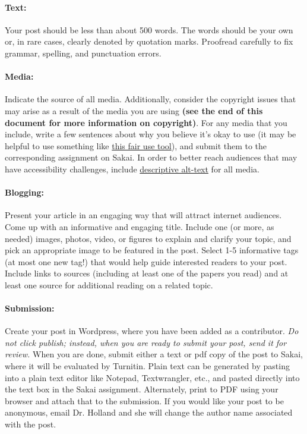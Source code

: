 \documentclass[11pt]{article}
\begin{document}
\paragraph{Text:} 
Your post should be less than about 500 words.  
The words should be your own or, in rare cases, clearly denoted by quotation marks.  
Proofread carefully to fix grammar, spelling, and punctuation errors. 

\paragraph{Media:}
Indicate the source of all media.  
Additionally, consider the copyright issues that may arise as a result of the media you are using
{\bf (see the end of this document for more information on copyright)}.  For any media that you include, write a few sentences about why you believe it's okay to use (it may be helpful to use something like \href{https://www.lib.umn.edu/copyright/fairthoughts}{this fair use tool}), and submit them to the corresponding assignment on Sakai.
In order to better reach audiences that may have accessibility challenges, include \href{https://accessibility.umn.edu/core-skills/alt-text#Alt%20text%20in%20Canvas}{descriptive alt-text} for all media.  

\paragraph{Blogging:} 
Present your article in an engaging way that will attract internet audiences.  
Come up with an informative and engaging title. 
Include one (or more, as needed) images, photos, video, or figures to explain and clarify your topic, and pick an appropriate image to be featured in the post.
Select 1-5 informative tags (at most one new tag!) that would help guide interested readers to your post. 
Include links to sources (including at least one of the papers you read) and at least one source for additional reading on a related topic. 

\paragraph{Submission: }
Create your post in Wordpress, where you have been added as a contributor.  
\emph{Do not click publish; instead, when you are ready to submit your post, send it for review.}
When you are done, submit either a text or pdf copy of the post to Sakai, where it will be evaluated by Turnitin.
Plain text can be generated by pasting into a plain text editor like Notepad, Textwrangler, etc., and pasted directly into the text box in the Sakai assignment.  Alternately, print to PDF using your browser and attach that to the submission.
If you would like your post to be anonymous, email Dr. Holland and she will change the author name associated with the post.
\end{document}
